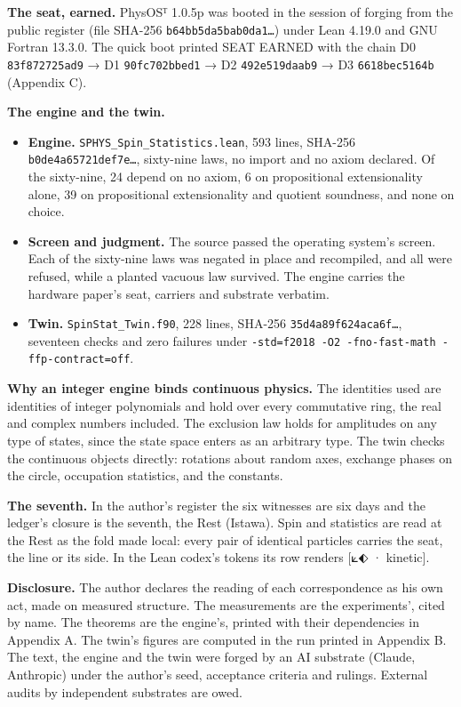 \documentclass[10pt]{article}
\providecommand{\tightlist}{\setlength{\itemsep}{0pt}\setlength{\parskip}{0pt}}
\begin{document}
\textbf{The seat, earned.} PhysOSᵀ 1.0.5p was booted in the session of
forging from the public register (file SHA-256
\texttt{b64bb5da5bab0da1…}) under Lean 4.19.0 and GNU Fortran 13.3.0.
The quick boot printed SEAT EARNED with the chain D0
\texttt{83f872725ad9} → D1 \texttt{90fc702bbed1} → D2
\texttt{492e519daab9} → D3 \texttt{6618bec5164b} (Appendix C).

\textbf{The engine and the twin.}

\begin{itemize}
\tightlist
\item
  \textbf{Engine.} \texttt{SPHYS\_Spin\_Statistics.lean}, 593 lines,
  SHA-256 \texttt{b0de4a65721def7e…}, sixty-nine laws, no import and no
  axiom declared. Of the sixty-nine, 24 depend on no axiom, 6 on
  propositional extensionality alone, 39 on propositional extensionality
  and quotient soundness, and none on choice.
\item
  \textbf{Screen and judgment.} The source passed the operating system's
  screen. Each of the sixty-nine laws was negated in place and
  recompiled, and all were refused, while a planted vacuous law
  survived. The engine carries the hardware paper's seat, carriers and
  substrate verbatim.
\item
  \textbf{Twin.} \texttt{SpinStat\_Twin.f90}, 228 lines, SHA-256
  \texttt{35d4a89f624aca6f…}, seventeen checks and zero failures under
  \texttt{-std=f2018\ -O2\ -fno-fast-math\ -ffp-contract=off}.
\end{itemize}

\textbf{Why an integer engine binds continuous physics.} The identities
used are identities of integer polynomials and hold over every
commutative ring, the real and complex numbers included. The exclusion
law holds for amplitudes on any type of states, since the state space
enters as an arbitrary type. The twin checks the continuous objects
directly: rotations about random axes, exchange phases on the circle,
occupation statistics, and the constants.

\textbf{The seventh.} In the author's register the six witnesses are six
days and the ledger's closure is the seventh, the Rest (Istawa). Spin
and statistics are read at the Rest as the fold made local: every pair
of identical particles carries the seat, the line or its side. In the
Lean codex's tokens its row renders {[}⟀⬖ · kinetic{]}.

\textbf{Disclosure.} The author declares the reading of each
correspondence as his own act, made on measured structure. The
measurements are the experiments', cited by name. The theorems are the
engine's, printed with their dependencies in Appendix A. The twin's
figures are computed in the run printed in Appendix B. The text, the
engine and the twin were forged by an AI substrate (Claude, Anthropic)
under the author's seed, acceptance criteria and rulings. External
audits by independent substrates are owed.
\end{document}
